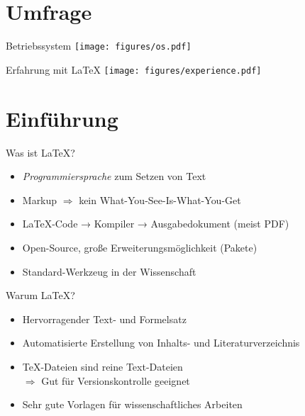 \section{Umfrage}

\begin{frame}{Betriebssystem}
  \centering
  \texttt{[image: figures/os.pdf]}
\end{frame}

\begin{frame}{Erfahrung mit LaTeX}
  \centering
  \texttt{[image: figures/experience.pdf]}
\end{frame}

\section{Einführung}

\begin{frame}{Was ist \LaTeX?}
  \Large
  \linespread{1.5}
  \begin{itemize}
    \item \emph{Programmiersprache} zum Setzen von Text
    \item Markup $\Rightarrow$ kein 
      \textcolor{TUgreen}{W}hat-\textcolor{TUgreen}{Y}ou-\textcolor{TUgreen}{S}ee-\textcolor{TUgreen}{I}s-\textcolor{TUgreen}{W}hat-\textcolor{TUgreen}{Y}ou-\textcolor{TUgreen}{G}et

    \item \LaTeX-Code → Kompiler → Ausgabedokument (meist PDF)
    \item Open-Source, große Erweiterungsmöglichkeit (Pakete)
    \item Standard-Werkzeug in der Wissenschaft
  \end{itemize}
  \linespread{1.0}
\end{frame}

\begin{frame}{Warum \LaTeX?}
  \Large
  \linespread{1.5}
  \begin{itemize}
    \item Hervorragender Text- und Formelsatz
    \item Automatisierte Erstellung von Inhalts- und Literaturverzeichnis
    \item \TeX-Dateien sind reine Text-Dateien \\
      $\Rightarrow$ Gut für Versionskontrolle geeignet
    \item Sehr gute Vorlagen für wissenschaftliches Arbeiten
  \end{itemize}
  \linespread{1.0}
\end{frame}

